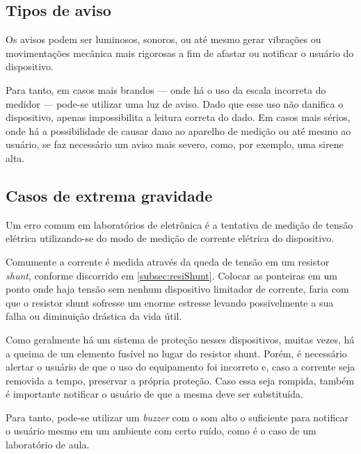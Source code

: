 \subsection{Tipos de aviso} \label{subsec:tiposdeaviso}

Os avisos podem ser luminosos, sonoros, ou até mesmo gerar vibrações ou movimentações mecânica mais rigorosas a fim de afastar ou notificar o usuário do dispositivo.\cite{base_alarms}

Para tanto, em casos mais brandos --- onde há o uso da escala incorreta do medidor --- pode-se utilizar uma luz de aviso. Dado que esse uso não danifica o dispositivo, apenas impossibilita a leitura correta do dado.
Em casos mais sérios, onde há a possibilidade de causar dano ao aparelho de medição ou até mesmo ao usuário, se faz necessário um aviso mais severo, como, por exemplo, uma sirene alta.

\subsection{Casos de extrema gravidade} \label{subsec:casosextrgraves}

Um erro comum em laboratórios de eletrônica é a tentativa de medição de tensão elétrica utilizando-se do modo de medição de corrente elétrica do dispositivo. 

Comumente a corrente é medida através da queda de tensão em um resistor \textit{shunt}, conforme discorrido em \ref{subsec:resiShunt}. Colocar as ponteiras em um ponto onde haja tensão sem nenhum dispositivo limitador de corrente, faria com que o resistor shunt sofresse um enorme estresse levando possivelmente a sua falha ou diminuição drástica da vida útil.

Como geralmente há um sistema de proteção nesses dispositivos, muitas vezes, há a queima de um elemento fusível no lugar do resistor shunt. Porém, é necessário alertar o usuário de que o uso do equipamento foi incorreto e, caso a corrente seja removida a tempo, preservar a própria proteção. Caso essa seja rompida, também é importante notificar o usuário de que a mesma deve ser substituída.

Para tanto, pode-se utilizar um \textit{buzzer} com o som alto o suficiente para notificar o usuário mesmo em um ambiente com certo ruído, como é o caso de um laboratório de aula. 



